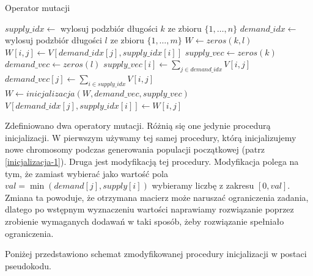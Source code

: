 \begin{pseudokod}[H]
    \label{mutacja}
    \caption{Operator mutacji}
    \BlankLine
    $supply\_idx \gets$ wylosuj podzbiór długości $k$ ze zbioru $\{1, \dots, n\}$\;
    $demand\_idx \gets$ wylosuj podzbiór długości $l$ ze zbioru $\{1, \dots, m\}$\;
    $W \gets zeros(k, l)$
    \BlankLine
     {
         {
            $W[i, j] \gets V[demand\_idx[j], supply\_idx[i]]$\;
        }
    }
    \BlankLine
    $supply\_vec \gets zeros(k)$
    $demand\_vec \gets zeros(l)$
    \BlankLine
     {
        $supply\_vec[i] \gets \sum_{j \in demand\_idx} V[i, j]$\;
    }
    \BlankLine
     {
        $demand\_vec[j] \gets \sum_{i \in supply\_idx} V[i, j]$\;
    }
    \BlankLine
    $W \gets inicjalizacja(W, demand\_vec, supply\_vec)$\;
    \BlankLine
     {
         {
            $V[demand\_idx[j], supply\_idx[i]] \gets W[i, j]$\;
        }
    }
    
\end{pseudokod}

Zdefiniowano dwa operatory mutacji. Różnią się one jedynie procedurą inicjalizacji. W pierwszym używamy tej samej procedury, którą inicjalizujemy 
nowe chromosomy podczas generowania populacji początkowej (patrz \ref{inicjalizacja-1}). Druga jest modyfikacją tej procedury. Modyfikacja polega na tym, że zamiast wybierać 
jako wartość pola $val = \min(demand[j], supply[i])$ wybieramy liczbę z zakresu $[0, val]$. Zmiana ta powoduje, że otrzymana macierz może naruszać 
ograniczenia zadania, dlatego po wstępnym wyznaczeniu wartości naprawiamy rozwiązanie poprzez zrobienie wymaganych dodawań w taki sposób, żeby 
rozwiązanie spełniało ograniczenia.

Poniżej przedstawiono schemat zmodyfikowanej procedury inicjalizacji w postaci pseudokodu.

